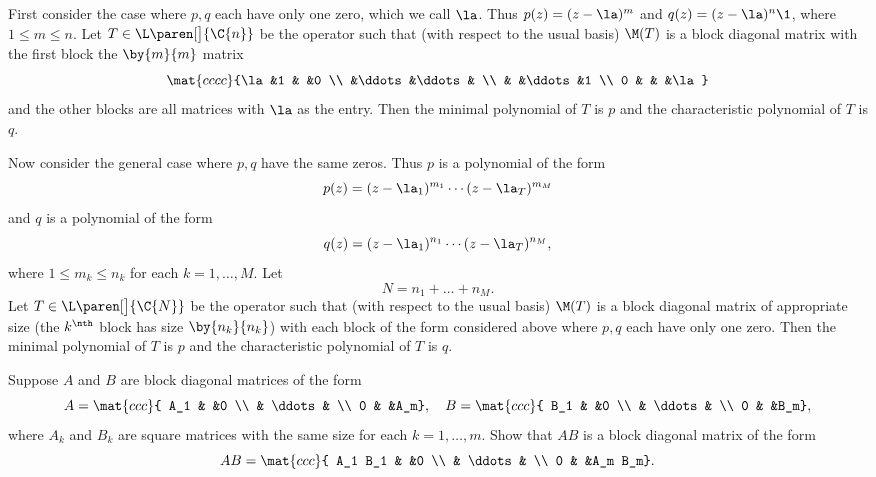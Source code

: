 \begin{Solution}
First consider the case where $p, q$ each have only one zero, which we call $\la$. Thus $p(z) = (z - \la)^m$ and $q(z) = (z-\la)^n\1$, where $1 \le m \le n$. Let $T \in \L\paren[\big]{\C{n}}$ be the operator such that (with respect to the usual basis) $\M(T)$ is a block diagonal matrix with the first block the $\by{m}{m}$ matrix
\[
\mat{cccc}{\la &1 & &0 \\
&\ddots &\ddots & \\
& &\ddots &1 \\
0 & & &\la} %
\]
and the other blocks are all  matrices with $\la$ as the entry. Then the minimal polynomial of $T$ is $p$ and the characteristic polynomial of $T$ is $q$.

Now consider the general case where $p, q$ have the same zeros. Thus $p$ is a polynomial of the form
\[
p(z) = (z - \la_1)^{m_1} \dotsm (z - \la_T)^{m_M}
\]
and $q$ is a polynomial of the form
\[
q(z) = (z - \la_1)^{n_1} \dotsm (z - \la_T)^{n_M},
\]
where $1 \le m_k \le n_k$ for each $k = 1, \dots, M$. Let
\[
N = n_1 + \dots + n_M.
\]
 Let $T \in \L\paren[\big]{\C{N}}$ be the operator such that (with respect to the usual basis) $\M(T)$ is a block diagonal matrix of appropriate size (the $k^\nth$ block has size $\by{n_k}{n_k}$) with each block of the form considered above where $p, q$ each have only one zero. Then the minimal polynomial of $T$ is $p$ and the characteristic polynomial of $T$ is $q$.
\end{Solution}

\exercise
Suppose $A$ and $B$ are block diagonal matrices of the form\label{blockmult}
\[
A = \mat{ccc}{
A_1 & &0 \\
& \ddots & \\
0 & &A_m},
\quad B = \mat{ccc}{
B_1 & &0 \\
& \ddots & \\
0 & &B_m},
\]
where $A_k$ and $B_k$ are square matrices with the same size for each $k = 1, \dots, m$. Show that $AB$ is a
block diagonal matrix of the form
\[
AB = \mat{ccc}{
A_1 B_1 & &0 \\
& \ddots & \\
0 & &A_m B_m}.
\]

